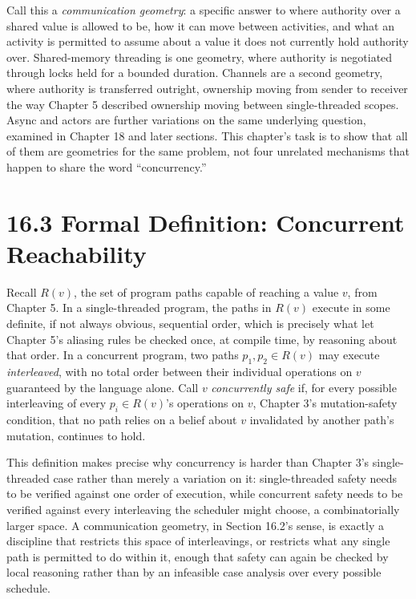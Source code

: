 \documentclass[11pt]{book}
\begin{document}
Call this a \emph{communication geometry}: a specific answer to where authority over a shared value is allowed to be, how it can move between activities, and what an activity is permitted to assume about a value it does not currently hold authority over. Shared-memory threading is one geometry, where authority is negotiated through locks held for a bounded duration. Channels are a second geometry, where authority is transferred outright, ownership moving from sender to receiver the way Chapter 5 described ownership moving between single-threaded scopes. Async and actors are further variations on the same underlying question, examined in Chapter 18 and later sections. This chapter's task is to show that all of them are geometries for the same problem, not four unrelated mechanisms that happen to share the word ``concurrency.''

\section*{16.3 Formal Definition: Concurrent Reachability}

Recall $R(v)$, the set of program paths capable of reaching a value $v$, from Chapter 5. In a single-threaded program, the paths in $R(v)$ execute in some definite, if not always obvious, sequential order, which is precisely what let Chapter 5's aliasing rules be checked once, at compile time, by reasoning about that order. In a concurrent program, two paths $p_1, p_2 \in R(v)$ may execute \emph{interleaved}, with no total order between their individual operations on $v$ guaranteed by the language alone. Call $v$ \emph{concurrently safe} if, for every possible interleaving of every $p_i \in R(v)$'s operations on $v$, Chapter 3's mutation-safety condition, that no path relies on a belief about $v$ invalidated by another path's mutation, continues to hold.

This definition makes precise why concurrency is harder than Chapter 3's single-threaded case rather than merely a variation on it: single-threaded safety needs to be verified against one order of execution, while concurrent safety needs to be verified against every interleaving the scheduler might choose, a combinatorially larger space. A communication geometry, in Section 16.2's sense, is exactly a discipline that restricts this space of interleavings, or restricts what any single path is permitted to do within it, enough that safety can again be checked by local reasoning rather than by an infeasible case analysis over every possible schedule.
\end{document}
